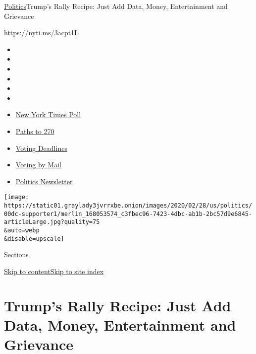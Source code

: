 \href{/section/politics}{Politics}\textbar{}Trump's Rally Recipe: Just
Add Data, Money, Entertainment and Grievance

\url{https://nyti.ms/3acpt1L}

\begin{itemize}
\item
\item
\item
\item
\item
\item
\end{itemize}

\begin{itemize}
\item
  \href{https://www.nytimes3xbfgragh.onion/2020/09/12/us/politics/biden-trump-poll-wisconsin-minnesota.html?action=click\&pgtype=Article\&state=default\&region=TOP_BANNER\&context=storylines_menu}{New
  York Times Poll}
\item
  \href{https://www.nytimes3xbfgragh.onion/interactive/2020/us/elections/election-states-biden-trump.html?action=click\&pgtype=Article\&state=default\&region=TOP_BANNER\&context=storylines_menu}{Paths
  to 270}
\item
  \href{https://www.nytimes3xbfgragh.onion/interactive/2019/us/elections/2020-presidential-election-calendar.html?action=click\&pgtype=Article\&state=default\&region=TOP_BANNER\&context=storylines_menu}{Voting
  Deadlines}
\item
  \href{https://www.nytimes3xbfgragh.onion/interactive/2020/08/31/us/politics/vote-by-mail-deadlines.html?action=click\&pgtype=Article\&state=default\&region=TOP_BANNER\&context=storylines_menu}{Voting
  by Mail}
\item
  \href{https://www.nytimes3xbfgragh.onion/newsletters/politics?action=click\&pgtype=Article\&state=default\&region=TOP_BANNER\&context=storylines_menu}{Politics
  Newsletter}
\end{itemize}

\texttt{[image: https://static01.graylady3jvrrxbe.onion/images/2020/02/28/us/politics/00dc-supporter1/merlin\_168053574\_c3fbec96-7423-4dbc-ab1b-2bc57d9e6845-articleLarge.jpg?quality=75\\\&auto=webp\\\&disable=upscale]}

Sections

\protect\hyperlink{site-content}{Skip to
content}\protect\hyperlink{site-index}{Skip to site index}

\hypertarget{trumps-rally-recipe-just-add-data-money-entertainment-and-grievance}{%
\section{Trump's Rally Recipe: Just Add Data, Money, Entertainment and
Grievance}\label{trumps-rally-recipe-just-add-data-money-entertainment-and-grievance}}

